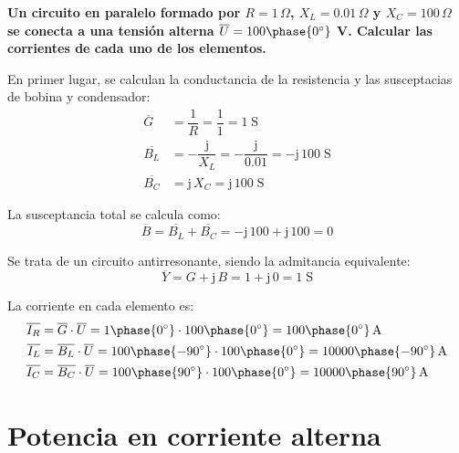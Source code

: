 \vspace{4mm}
\begin{example}\label{ej.2-5}
  \textbf{Un circuito en paralelo formado por $R=1\,\Omega$,
    ${X_L}=0.01\,\Omega$ y ${X_C}=100\,\Omega$ se conecta a una
    tensión alterna $\overline{U}=100\phase{0^\circ}$ V. Calcular las
    corrientes de cada uno de los elementos.}
		
  En primer lugar, se calculan la conductancia de la resistencia y las
  susceptacias de bobina y condensador:
  \begin{align*}
    \overline{G}&=\dfrac{1}{R}=\dfrac{1}{1}=1\;\si{\siemens}\\
    \overline{B_L}&=-\dfrac{\mathrm{j}}{X_L}=-\dfrac{\mathrm{j}}{0.01}=-\mathrm{j}\,100\;\si{\siemens}\\
    \overline{B_C}&=\mathrm{j}\,X_C=\mathrm{j}\,100\;\si{\siemens}
  \end{align*}
		
  La susceptancia total se calcula como:
  \begin{equation*}
    \overline{B}= \overline{B_L}+\overline{B_C}=-\mathrm{j}\,100+\mathrm{j}\,100=0
  \end{equation*}
		
  Se trata de un circuito antirresonante, siendo la admitancia
  equivalente:
  \begin{equation*}
    \overline{Y}=G+\mathrm{j}\,B=1+\mathrm{j}\,0=1\;\si{\siemens}
  \end{equation*}
		
  La corriente en cada elemento es:
  \begin{align*}
    \overline{I_R}&=\overline{G}\cdot \overline{U}={1\phase{0^\circ}}\cdot {100\phase{0^\circ}}=100\phase{0^\circ}\,\si{\ampere}\\
    \overline{I_L}&=\overline{B_L}\cdot\overline{U}=100\phase{-90^\circ}\cdot 100\phase{0^\circ}=10000\phase{-90^\circ}\,\si{\ampere}\\
    \overline{I_C}&=\overline{B_C}\cdot\overline{U}=100\phase{90^\circ}\cdot 100\phase{0^\circ}=10000\phase{90^\circ}\,\si{\ampere}
  \end{align*}
\end{example}
	
	

\section{Potencia en corriente alterna}\label{sec.potencia_CA}
	
